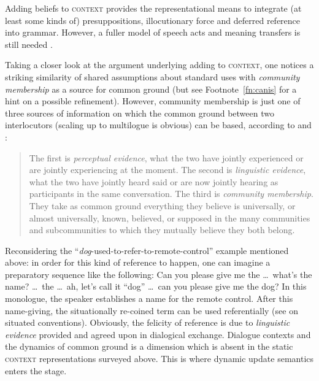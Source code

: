 \documentclass[output=paper
 	        ,biblatex
                ,babelshorthands
                ,newtxmath
                ,draftmode
                ,colorlinks, citecolor=brown
]{langscibook}
\begin{document}
\noindent Adding beliefs to \textsc{context} provides the representational means to integrate (at least some kinds of) presuppositions, illocutionary force and deferred reference \citep{Nunberg:1978} into grammar.
%
However, a fuller model of speech acts and meaning transfers is still needed \citep[]{Kathol:Przepiorkowski:Tseng:2011}. %


Taking a closer look at the argument underlying adding  to \textsc{context}, one notices a striking similarity of shared assumptions about standard uses with \emph{community membership} as a source for common ground (but see Footnote~\ref{fn:canis} for a hint on a possible refinement).
%
However, community membership is just one of three sources of information on which the common ground between two interlocutors (scaling up to multilogue is obvious) can be based, according to \citet{Clark:Marshall:1981} and \citet{Clark:Schreuder:Buttrick:1983}:
%
\begin{quote}
The first is \emph{perceptual evidence}, what the two have jointly experienced or are jointly experiencing at the moment. The second is \emph{linguistic evidence}, what the two have jointly heard said or are now jointly hearing as participants in the same conversation. The third is \emph{community membership}. They take as common ground everything they believe is universally, or almost universally, known, believed, or supposed in the many communities and subcommunities to which they mutually believe they both belong. \hfill \citep[]{Clark:Schreuder:Buttrick:1983} 
\end{quote}


Reconsidering the \enquote{\emph{dog}-used-to-refer-to-remote-control} example mentioned above: in order for this kind of reference to happen, one can imagine a preparatory sequence like the following:
%
\ea
Can you please give me the \ldots\ what's the name? \ldots\ the \ldots\ ah, let's call it \enquote{dog} \ldots\ can you please give me the dog?
\z
% 
In this monologue, the speaker establishes a name for the remote control.
%
After this name-giving, the situationally re-coined term can be used referentially (see \citealt{Luecking:Rieser:Staudacher:2006:b} on situated conventions).
%
Obviously, the felicity of reference is due to \emph{linguistic evidence} provided and agreed upon in dialogical exchange.
%
Dialogue contexts \citep{Lee-Goldman:2011} and the dynamics of common ground is a dimension which is absent in the static \textsc{context} representations surveyed above.
%
This is where dynamic update semantics enters the stage.
\end{document}
